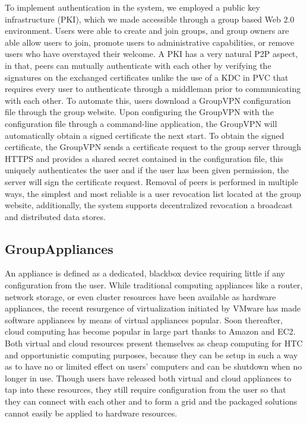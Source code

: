\documentclass{sig-alternate}
\begin{document}
To implement authentication in the system, we employed a public key
infrastructure (PKI), which we made accessible through a group based Web 2.0
environment.  Users were able to create and join groups, and group owners are
able allow users to join, promote users to administrative capabilities, or
remove users who have overstayed their welcome.  A PKI has a very natural P2P
aspect, in that, peers can mutually authenticate with each other by verifying
the signatures on the exchanged certificates unlike the use of a KDC in PVC
that requires every user to authenticate through a middleman prior to
communicating with each other.  To automate this, users download a GroupVPN
configuration file through the group website.  Upon configuring the GroupVPN
with the configuration file through a command-line application, the GroupVPN
will automatically obtain a signed certificate the next start.  To obtain the
signed certificate, the GroupVPN sends a certificate request to the group
server through HTTPS and provides a shared secret contained in the
configuration file, this uniquely authenticates the user and if the user has
been given permission, the server will sign the certificate request.  Removal
of peers is performed in multiple ways, the simplest and most reliable is a
user revocation list located at the group website, additionally, the system
supports decentralized revocation a broadcast and distributed data stores.

\subsection{GroupAppliances}
An appliance is defined as a dedicated, blackbox device requiring little if any
configuration from the user.  While traditional computing appliances like a
router, network storage, or even cluster resources have been available as
hardware appliances, the recent resurgence of virtualization initiated by
VMware has made software appliances by means of virtual appliances popular.
Soon thereafter, cloud computing has become popular in large part thanks to
Amazon and EC2.  Both virtual and cloud resources present themselves as cheap
computing for HTC and opportunistic computing purposes, because they can be
setup in such a way as to have no or limited effect on users' computers and
can be shutdown when no longer in use.  Though users have released both virtual
and cloud appliances to tap into these resources, they still require
configuration from the user so that they can connect with each other and to form
a grid and the packaged solutions cannot easily be applied to hardware resources.
\end{document}
